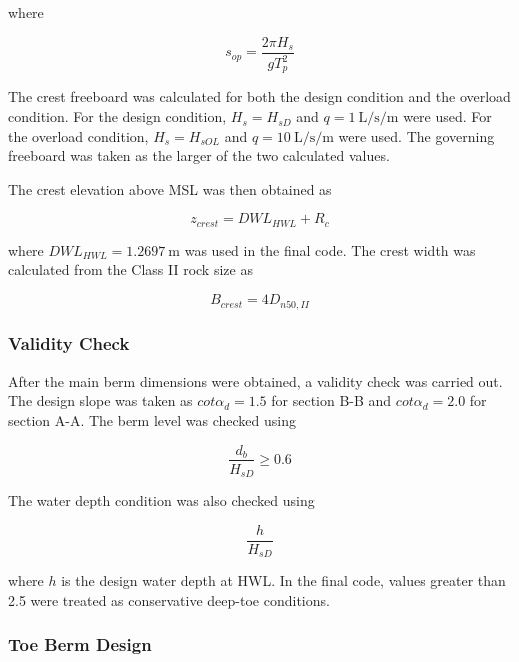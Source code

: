 \documentclass[a4paper, 11pt]{article}
\begin{document}
where

\begin{equation}
    s_{op}=\frac{2\pi H_s}{gT_p^2}
    \label{eq:berm_sop}
\end{equation}

The crest freeboard was calculated for both the design condition and the overload condition. For the design condition, \(H_s=H_{sD}\) and \(q=1~\mathrm{L/s/m}\) were used. For the overload condition, \(H_s=H_{sOL}\) and \(q=10~\mathrm{L/s/m}\) were used. The governing freeboard was taken as the larger of the two calculated values.

The crest elevation above MSL was then obtained as

\begin{equation}
    z_{crest}=DWL_{HWL}+R_c
    \label{eq:berm_zcrest}
\end{equation}

where \(DWL_{HWL}=1.2697~\mathrm{m}\) was used in the final code. The crest width was calculated from the Class II rock size as

\begin{equation}
    B_{crest}=4D_{n50,II}
    \label{eq:berm_crest_width}
\end{equation}

\subsubsection{Validity Check}

\hspace*{0.5cm} After the main berm dimensions were obtained, a validity check was carried out. The design slope was taken as \(cot\alpha_d=1.5\) for section B-B and \(cot\alpha_d=2.0\) for section A-A. The berm level was checked using

\begin{equation}
    \frac{d_b}{H_{sD}}\geq0.6
\end{equation}

The water depth condition was also checked using

\begin{equation}
    \frac{h}{H_{sD}}
\end{equation}

where \(h\) is the design water depth at HWL. In the final code, values greater than 2.5 were treated as conservative deep-toe conditions.

\subsubsection{Toe Berm Design}
\end{document}
